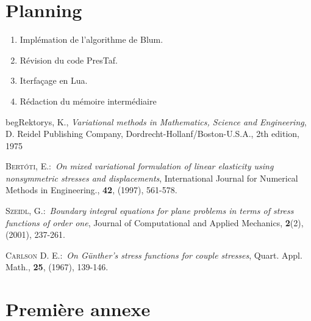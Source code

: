 \documentclass{article}%
\begin{document}
\section{Planning}

\begin{enumerate}
\item Impl\'emation de l'algorithme de Blum.
\item R\'evision du code PresTaf.
\item Iterfa\c{c}age en Lua.
\item R\'edaction du m\'emoire interm\'ediaire
\end{enumerate}

\begin{thebibliography}{9}                                                                                                %
begRektorys, K., \textit{Variational methods in Mathematics,
Science and Engineering}, D. Reidel Publishing Company,
Dordrecht-Hollanf/Boston-U.S.A., 2th edition, 1975

 \textsc{Bert\'{o}ti, E.}:\ \textit{On mixed variational formulation
of linear elasticity using nonsymmetric stresses and displacements}, International
Journal for Numerical Methods in Engineering., \textbf{42}, (1997), 561-578.

 \textsc{Szeidl, G.}:\ \textit{Boundary integral equations for
plane problems in terms of stress functions of order one}, Journal of Computational and
Applied Mechanics, \textbf{2}(2), (2001), 237-261.

  \textsc{Carlson D. E.}:\ \textit{On G\"{u}nther's stress functions
for couple stresses}, Quart. Appl. Math., \textbf{25}, (1967), 139-146.
\end{thebibliography}


\appendix

\section{Premi\`ere annexe}
\end{document}
